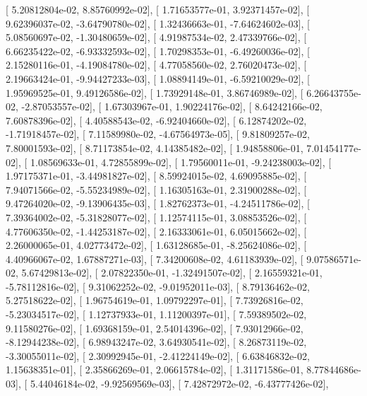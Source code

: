 \documentclass{article}
\begin{document}
       [  5.20812804e-02,   8.85760992e-02],
       [  1.71653577e-01,   3.92371457e-02],
       [  9.62396037e-02,  -3.64790780e-02],
       [  1.32436663e-01,  -7.64624602e-03],
       [  5.08560697e-02,  -1.30480659e-02],
       [  4.91987534e-02,   2.47339766e-02],
       [  6.66235422e-02,  -6.93332593e-02],
       [  1.70298353e-01,  -6.49260036e-02],
       [  2.15280116e-01,  -4.19084780e-02],
       [  4.77058560e-02,   2.76020473e-02],
       [  2.19663424e-01,  -9.94427233e-03],
       [  1.08894149e-01,  -6.59210029e-02],
       [  1.95969525e-01,   9.49126586e-02],
       [  1.73929148e-01,   3.86746989e-02],
       [  6.26643755e-02,  -2.87053557e-02],
       [  1.67303967e-01,   1.90224176e-02],
       [  8.64242166e-02,   7.60878396e-02],
       [  4.40588543e-02,  -6.92404660e-02],
       [  6.12874202e-02,  -1.71918457e-02],
       [  7.11589980e-02,  -4.67564973e-05],
       [  9.81809257e-02,   7.80001593e-02],
       [  8.71173854e-02,   4.14385482e-02],
       [  1.94858806e-01,   7.01454177e-02],
       [  1.08569633e-01,   4.72855899e-02],
       [  1.79560011e-01,  -9.24238003e-02],
       [  1.97175371e-01,  -3.44981827e-02],
       [  8.59924015e-02,   4.69095885e-02],
       [  7.94071566e-02,  -5.55234989e-02],
       [  1.16305163e-01,   2.31900288e-02],
       [  9.47264020e-02,  -9.13906435e-03],
       [  1.82762373e-01,  -4.24511786e-02],
       [  7.39364002e-02,  -5.31828077e-02],
       [  1.12574115e-01,   3.08853526e-02],
       [  4.77606350e-02,  -1.44253187e-02],
       [  2.16333061e-01,   6.05015662e-02],
       [  2.26000065e-01,   4.02773472e-02],
       [  1.63128685e-01,  -8.25624086e-02],
       [  4.40966067e-02,   1.67887271e-03],
       [  7.34200608e-02,   4.61183939e-02],
       [  9.07586571e-02,   5.67429813e-02],
       [  2.07822350e-01,  -1.32491507e-02],
       [  2.16559321e-01,  -5.78112816e-02],
       [  9.31062252e-02,  -9.01952011e-03],
       [  8.79136462e-02,   5.27518622e-02],
       [  1.96754619e-01,   1.09792297e-01],
       [  7.73926816e-02,  -5.23034517e-02],
       [  1.12737933e-01,   1.11200397e-01],
       [  7.59389502e-02,   9.11580276e-02],
       [  1.69368159e-01,   2.54014396e-02],
       [  7.93012966e-02,  -8.12944238e-02],
       [  6.98943247e-02,   3.64930541e-02],
       [  8.26873119e-02,  -3.30055011e-02],
       [  2.30992945e-01,  -2.41224149e-02],
       [  6.63846832e-02,   1.15638351e-01],
       [  2.35866269e-01,   2.06615784e-02],
       [  1.31171586e-01,   8.77844686e-03],
       [  5.44046184e-02,  -9.92569569e-03],
       [  7.42872972e-02,  -6.43777426e-02],
\end{document}
